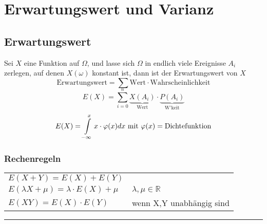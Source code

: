 \section{Erwartungswert und Varianz}

\subsection{Erwartungswert }
\begin{minipage}[t]{9cm}
Sei $X$ eine Funktion auf $\Omega$, und lasse sich $\Omega$ in endlich viele
Ereignisse $A_i$ zerlegen, auf denen $X(\omega)$ konstant ist, dann ist der
Erwartungswert von $X$ 
\[ \text{Erwartungswert} = \sum \text{Wert} \cdot \text{Wahrscheinlichkeit}\] 
\[\boxed{E(X)=\sum\limits_{i=0}^n \underbrace{X(A_i)}_{\text{Wert}}\cdot
\underbrace{P(A_i)}_{\text{W'keit}}}\] 
\[E(X) = \int\limits_{-\infty}^x x \cdot \varphi(x) dx$ mit $\varphi(x) =
\text{Dichtefunktion}\] 
\end{minipage}
\hspace{1cm}
\begin{minipage}[t]{9cm}
\subsubsection{Rechenregeln }
\begin{tabular}{ll}
  $E(X+Y)=E(X)+E(Y)$ \\
  $E(\lambda X + \mu) = \lambda \cdot E(X) + \mu$ & $\lambda, \mu \in
  \mathbb{R}$ \\
  $E(XY) = E(X)\cdot E(Y)$ & wenn X,Y unabhängig sind \\
\end{tabular}
\end{minipage}

\hrule


